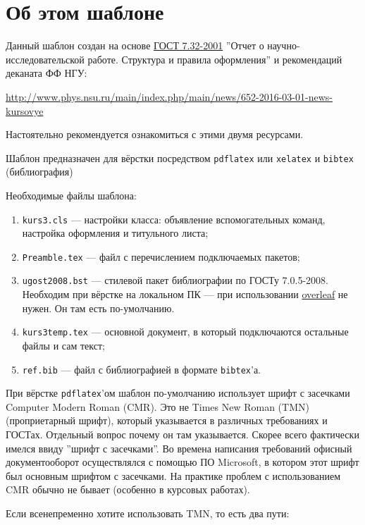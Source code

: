 \chapter{Об этом шаблоне}\label{ch:about}




Данный шаблон создан на основе \href{https://docs.cntd.ru/document/1200026224}{ГОСТ 7.32-2001} ''Отчет о научно-иссле\-до\-ва\-тельской работе. Структура и правила оформления'' и рекомендаций деканата ФФ НГУ:

\href{http://www.phys.nsu.ru/main/index.php/main/news/652-2016-03-01-news-kursovye}{\small http://www.phys.nsu.ru/main/index.php/main/news/652-2016-03-01-news-kursovye}

Настоятельно рекомендуется ознакомиться с этими двумя ресурсами.

Шаблон предназначен для вёрстки посредством \verb*|pdflatex| или \verb*|xelatex| и \verb*|bibtex| (библиография)

Необходимые файлы шаблона:
\begin{enumerate}
	\item \verb*|kurs3.cls| --- настройки класса: объявление вспомогательных команд, настройка оформления и титульного листа;
	\item \verb*|Preamble.tex| --- файл с перечислением подключаемых пакетов;
	\item \verb*|ugost2008.bst| --- стилевой пакет библиографии по ГОСТу 7.0.5-2008. Необходим при вёрстке на локальном ПК --- при использовании \href{https://www.overleaf.com}{overleaf} не нужен. Он там есть по-умолчанию.
	\item \verb*|kurs3temp.tex| --- основной документ, в который подключаются остальные файлы и сам текст;
	\item  \verb*|ref.bib| --- файл с библиографией в формате \verb*|bibtex|'а.
\end{enumerate}

При вёрстке \verb*|pdflatex|'ом шаблон по-умолчанию использует шрифт с засечками Computer Modern Roman (CMR). Это не Times New Roman (TMN) (проприетарный шрифт), который указывается в различных требованиях и ГОСТах. Отдельный вопрос почему он там указывается. Скорее всего фактически имелся ввиду ''шрифт с засечками''. Во времена написания требований офисный документооборот осуществлялся с помощью ПО Microsoft, в котором этот шрифт был основным шрифтом с засечками. На практике проблем с использованием CMR обычно не бывает (особенно в курсовых работах).

Если всенепременно хотите использовать TMN, то есть два пути:

